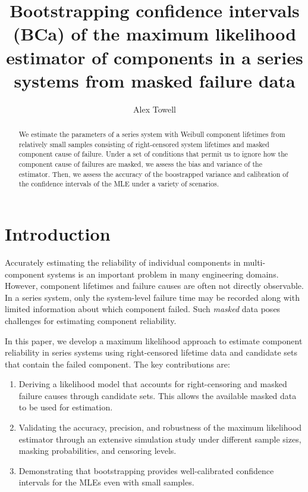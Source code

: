 \documentclass[
]{article}
\title{Bootstrapping confidence intervals (BCa) of the maximum
likelihood estimator of components in a series systems from masked
failure data}
\author{Alex Towell}
\date{}
\begin{document}
\maketitle
\begin{abstract}
We estimate the parameters of a series system with Weibull component
lifetimes from relatively small samples consisting of right-censored
system lifetimes and masked component cause of failure. Under a set of
conditions that permit us to ignore how the component cause of failures
are masked, we assess the bias and variance of the estimator. Then, we
assess the accuracy of the boostrapped variance and calibration of the
confidence intervals of the MLE under a variety of scenarios.
\end{abstract}

{
\setcounter{tocdepth}{2}
\tableofcontents
}
\newcommand{\T}{T}
\newtheorem{definition}{Definition}
\newtheorem{theorem}{Theorem}
\newtheorem{corollary}{Corollary}
\newtheorem{condition}{Condition}
\renewcommand{\v}[1]{\boldsymbol{#1}}

\hypertarget{introduction}{%
\section{Introduction}\label{introduction}}

Accurately estimating the reliability of individual components in
multi-component systems is an important problem in many engineering
domains. However, component lifetimes and failure causes are often not
directly observable. In a series system, only the system-level failure
time may be recorded along with limited information about which
component failed. Such \emph{masked} data poses challenges for
estimating component reliability.

In this paper, we develop a maximum likelihood approach to estimate
component reliability in series systems using right-censored lifetime
data and candidate sets that contain the failed component. The key
contributions are:

\begin{enumerate}
\def\labelenumi{\arabic{enumi}.}
\item
  Deriving a likelihood model that accounts for right-censoring and
  masked failure causes through candidate sets. This allows the
  available masked data to be used for estimation.
\item
  Validating the accuracy, precision, and robustness of the maximum
  likelihood estimator through an extensive simulation study under
  different sample sizes, masking probabilities, and censoring levels.
\item
  Demonstrating that bootstrapping provides well-calibrated confidence
  intervals for the MLEs even with small samples.
\end{enumerate}
\end{document}
